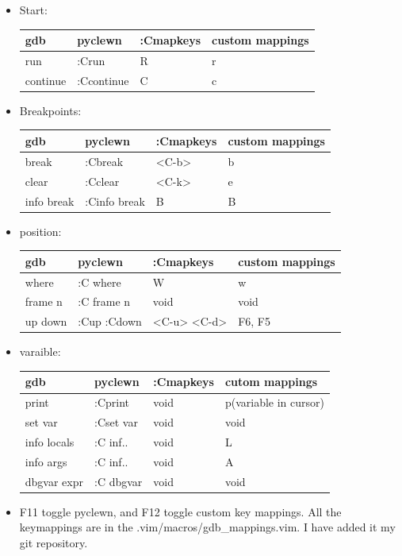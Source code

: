 \documentclass[a4paper,11pt,twoside]{book}
\begin{document}
\begin{itemize}
\item Start: \\
\begin{tabular}{p{}|p{}|p{}|p{}}
		\hline 
		gdb & pyclewn & :Cmapkeys & custom mappings \\
		\hline
		run & :Crun & R & r\\
		\hline 
		continue & :Ccontinue & C& c\\
		\hline 
		\end{tabular}
		
\item Breakpoints: \\
\begin{tabular}{p{}|p{}|p{}|p{}}
		\hline 
		gdb & pyclewn & :Cmapkeys & custom mappings \\
		\hline
		break & :Cbreak & <C-b> & b\\
		\hline 
		clear & :Cclear & <C-k>& e\\
		\hline 
		info break & :Cinfo break & B& B \\
		\hline
		\end{tabular}

\item position: \\
\begin{tabular}{p{}|p{}|p{}|p{}}
		\hline 
		gdb & pyclewn & :Cmapkeys & custom mappings \\
		\hline
		where & :C where & W & w\\
		\hline 
		frame n & :C frame n & void &void \\
		\hline 
		up down & :Cup :Cdown & <C-u> <C-d> &F6, F5\\
		\hline
		\end{tabular}

\item varaible: \\
\begin{tabular}{p{}|p{}|p{}|p{}}
		\hline 
		gdb & pyclewn & :Cmapkeys & cutom mappings\\
		\hline
		print &:Cprint  &void & p(variable in cursor) \\
		\hline 
		set var  & :Cset var & void& void \\
		\hline 
		info locals & :C inf.. & void & L\\
		\hline
		info args & :C inf.. & void & A \\
		\hline
		dbgvar expr & :C dbgvar & void& void \\
		\hline 
		\end{tabular}

\item F11 toggle pyclewn, and F12 toggle custom key mappings. All the keymappings are in the .vim/macros/gdb\_mappings.vim. I have added it my git repository. 
\end{itemize}
\end{document}
